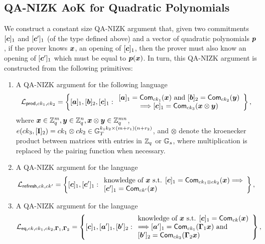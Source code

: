 \subsection{QA-NIZK AoK for Quadratic Polynomials}
We construct a constant size QA-NIZK argument that, given two commitments $[{\boldsymbol{c}}]_1$ and $[{\boldsymbol{c}}']_1$ (of the type defined above)  and a vector of quadratic polynomials ${\boldsymbol{p}}$, if the prover knows ${\boldsymbol{x}}$, an opening of $[{\boldsymbol{c}}]_1$, then the prover must also know an opening of $[{\boldsymbol{c}}']_1$ which must be equal to ${\boldsymbol{p}}({\boldsymbol{x}})$.
In turn, this QA-NIZK argument is constructed from the following primitives:
\begin{enumerate}
\item A QA-NIZK argument for the following language
$$
\mathcal{L}_{\mathsf{prod},ck_1,ck_2}=\left\{[{\boldsymbol{a}}]_1,[{\boldsymbol{b}}]_2,[{\boldsymbol{c}}]_1:
	\begin{array}{c}
		[{\boldsymbol{a}}]_1=\mathsf{Com}_{ck_1}({\boldsymbol{x}})\text{ and }
		{[{\boldsymbol{b}}]_2=\mathsf{Com}_{ck_2}({\boldsymbol{y}})}\\
		\Longrightarrow
		[{\boldsymbol{c}}]_1=\mathsf{Com}_{ck_3}({\boldsymbol{x}}\otimes{\boldsymbol{y}})
	\end{array}\right\},
$$
where ${\boldsymbol{x}}\in\mathbb{Z}_q^m,{\boldsymbol{y}}\in\mathbb{Z}_q^n,{\boldsymbol{x}}\otimes{\boldsymbol{y}}\in\mathbb{Z}_q^{mn}$, $e(ck_3,[\mathbf{{I}}]_{2})=ck_1\otimes ck_2\allowbreak\in\mathbb{G}_T^{k_1k_2\times(m+r_1)(n+r_2)}$, and $\otimes$ denote the kroenecker product between matrices with entries in $\mathbb{Z}_q$ or $\mathbb{G}_s$, where multiplication is replaced by the pairing function when necessary.
\item A QA-NIZK argument for the language
$$
\mathcal{L}_{\mathsf{refresh},ck,ck'} = \left\{[{\boldsymbol{c}}]_1,[{\boldsymbol{c}}']_1:
	\begin{array}{l} \text{knowledge of } {\boldsymbol{x}} \text{ s.t. }
		{[{\boldsymbol{c}}]_1=\mathsf{Com}_{ck_1\otimes ck_2}({\boldsymbol{x}})}
		\Longrightarrow\\
		{[{\boldsymbol{c}}']_1=\mathsf{Com}_{ck'}({\boldsymbol{x}})}
	\end{array}\right\},
$$
\item A QA-NIZK argument for the language
$$
\mathcal{L}_{\mathsf{eq},ck,ck_1,ck_2,\mathbf{{\Gamma}}_1,\mathbf{{\Gamma}}_2} = \left\{[{\boldsymbol{c}}]_1,[{\boldsymbol{a}}']_1,[{\boldsymbol{b}}']_2:
	\begin{array}{l}
		\text{knowledge of } {\boldsymbol{x}} \text{ s.t. }[{\boldsymbol{c}}]_1=\mathsf{Com}_{ck}({\boldsymbol{x}})\\
		\Longrightarrow
		[{\boldsymbol{a}}']_1=\mathsf{Com}_{ck_1}(\mathbf{{\Gamma}}_1{\boldsymbol{x}})\text{ and }\\
		{[{\boldsymbol{b}}']_2=\mathsf{Com}_{ck_2}(\mathbf{{\Gamma}}_2{\boldsymbol{x}})}
	\end{array}\right\},
$$
\end{enumerate}

